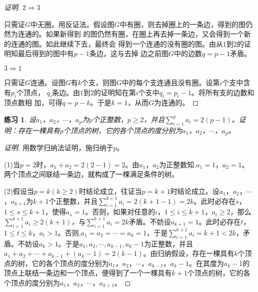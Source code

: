 \documentclass{book}[oneside]
\newtheorem{Thm}{定理}
\newtheorem{Exercise}{练习}
\begin{document}
\begin{CJK*}{UTF8}{gbsn}
\begin{proof}[证明]
    $2\Rightarrow3$

只需证$G$中无圈。用反证法。假设图$G$中有圈，则去掉圈上的一条边，得到的图仍然为连通的。如果新得到
的图仍然有圈，在圈上再去掉一条边，又会得到一个新的连通的图。如此继续下去，最终会
得到一个连通的没有圈的图。由从$1$到$2$的证明知最后得到的图中有$p-1$条边，这与去掉
边之前图$G$中的边数$q=p-1$矛盾。


 $3\Rightarrow1$

 只需证$G$连通。设图$G$有$k$个支，则图$G$中的每个支连通且没有圈。设第$i$个支中含有$p_i$个顶点，
$q_i$条边。由$1$到$2$的证明知在第$i$个支中$q_i=p_i-1$。将所有支的边数和顶点数相
加，可得$q = p-k$。于是$k=1$，从而$G$为连通的。
\end{proof}

\begin{Exercise}
  设$a_1$，$a_2$，$\cdots$，$a_p$为$p$个正整数，$p\geq 2$，并且$\sum_{i=1}^pa_i=2(p-1)$。证明：存在一棵具有$p$个顶点的树，它的各个顶点的度分别为$a_1$，$a_2$，$\cdots$，$a_p$。
\end{Exercise}
\begin{proof}[证明]  用数学归纳法证明，施归纳于$p$。

  (1)当$p=2$时，$a_1+a_2=2(2-1)=2$。由$a_1$，$a_2$为正整数知,$a_1=1$，$a_2=1$。两个顶点之间联结一条边，就构成了一棵满足条件的树。

  (2)假设当$p=k(k\geq 2)$时结论成立，往证当$p=k+1$时结论成立。设$a_1$，$a_2$，$\cdots$，$a_{k+1}$为$k+1$个正整数，并且$\sum_{i=1}^{k+1}a_i=2(k+1-1)=2k$。此时必存在$s$，$1\leq s \leq k+1$，使得$a_s=1$。否则，如果对任意的$i$，$1\leq i \leq k+1$，$a_i\geq 2$，那么$\sum_{i=1}^{k+1}a_i\geq 2(k+1)$，与$\sum_{i=1}^{k+1}a_i=2k$矛盾。不妨设$a_{k+1}=1$。此时必存在$t$，$1\leq t \leq k$，$a_t>1$。否则,$a_1=a_2=\cdots=a_k=1$，于是$\sum_{i=1}^{k+1}a_i=k+1<2k$，矛盾。不妨设$a_k>1$。于是$a_1,a_2,\cdots,a_{k-1},a_{k}-1$为正整数，并且$a_1 + a_2 + \cdots + a_{k-1} + (a_{k}-1) = 2(k-1)$。由归纳假设，存在一棵具有$k$个顶点的树，它的各个顶点的度分别为$a_1$，$a_2$，$\cdots$，$a_{k-1}$，$a_k-1$。在其度为$a_k-1$的顶点上联结一条边和一个顶点，便得到了一个一棵具有$k+1$个顶点的树，它的各个顶点的度分别为$a_1$，$a_2$，$\cdots$，$a_{k+1}$。
\end{proof}



\end{CJK*}
\end{document}

